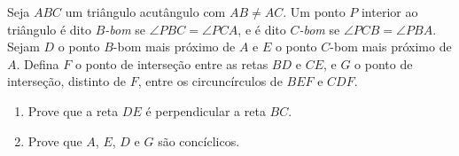 Seja $ABC$ um triângulo acutângulo com $AB \neq AC$. Um ponto $P$ interior ao triângulo é dito \emph{$B$-bom} se $\angle PBC = \angle PCA$, e é dito \emph{$C$-bom} se $\angle PCB = \angle PBA$.
Sejam $D$ o ponto $B$-bom mais próximo de $A$ e $E$ o ponto $C$-bom mais próximo de $A$.
Defina $F$ o ponto de interseção entre as retas $BD$ e $CE$, e $G$ o ponto de interseção, distinto de $F$, entre os circuncírculos de $BEF$ e $CDF$.

\begin{enumerate}[label = (\alph*)]
	\item Prove que a reta $DE$ é perpendicular a reta $BC$.
	\item Prove que $A$, $E$, $D$ e $G$ são concíclicos.
\end{enumerate}
